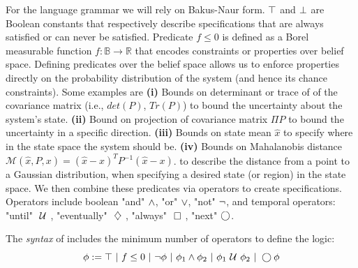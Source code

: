 \documentclass[conference]{IEEEtran}
\begin{document}
    For the language grammar we will rely on Bakus-Naur form. $\top$ and $\perp$ are Boolean constants that respectively describe specifications that are always satisfied or can never be satisfied. 
    Predicate $f\leq 0$ is defined as a Borel measurable function $f:\mathbb{B}\rightarrow \mathbb{R}$ that encodes constraints or properties over belief space. Defining predicates over the belief space allows us to enforce properties directly on the probability distribution of the system (and hence its chance constraints). Some examples are \textbf{(i)} Bounds on determinant or trace of of the covariance matrix (i.e., $det(P)$, $Tr(P)$) to  bound the uncertainty about the system's state. \textbf{(ii)} Bound on projection of covariance matrix $\Pi P$ to bound the uncertainty in a specific direction.
%
%
    \textbf{(iii)} Bounds on state mean $\hat{x}$ to specify
    where in the state space the system should be. \textbf{(iv)} Bounds on Mahalanobis distance $\mathcal{M}(\hat{x},P,x) = (\hat{x}-x)^TP^{-1}(\hat{x}-x)$.
    to describe the distance from a point to a Gaussian distribution, when specifying a desired state (or region) in the state space. We then combine these predicates via operators to create specifications. Operators include boolean "and" $\wedge$, "or" $\vee$, "not" $\neg$, and temporal operators: "until" $\ \mathcal{U}\ $, "eventually" $\ \diamondsuit\ $, "always" $\ \square\ $, "next" $\bigcirc$.
    
    
    \begin{definition}
    \label{def:gdtl-syntax}
    The {\em syntax} of \DTL includes the minimum number of operators to define the logic:
    \begin{equation*}
     \phi :=  \top \ |\ f \leq 0 \ |\ \neg \phi \ |\ \phi_1 \wedge \phi_2 \ |\ \phi_1 \ \mathcal{U}\  \phi_2 \ |\ \bigcirc \phi
    \end{equation*}
    \end{definition}
\end{document}
